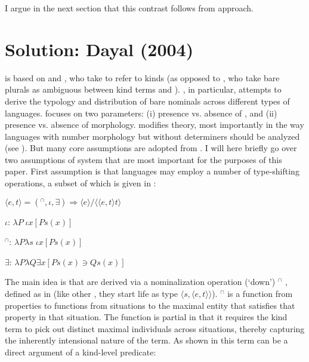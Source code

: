\documentclass[output=paper,
modfonts
]{langscibook}
\begin{document}
	I argue in the next section that this contrast follows from  approach.
	
	\section{Solution: Dayal (2004)} \label{sec:despic:3} 
	
	\citet{Dayal2004} is based on \citet{Chierchia1998} and \citet{Carlson1977}, who take   to refer to kinds (as opposed to \citealt{Wilkinson1991, Diesing1992, KrifkaGerstnerLink1993, Kratzer1995}, who take bare plurals as ambiguous between kind terms and ). \citet{Chierchia1998}, in particular, attempts to derive the typology and distribution of bare nominals across different types of languages. \citet{Chierchia1998} focuses on two parameters: (i) presence vs. absence of , and (ii) presence vs. absence of  morphology. \citet{Dayal2004}
	modifies  theory, most importantly in the way languages with number
	morphology but without determiners should be analyzed (see ). But many core assumptions are adopted from \citet{Chierchia1998}. I will here briefly go over two assumptions of  system that are most important for the purposes of this paper. First assumption is that languages may employ a number of type-shifting operations, a subset of
	which is given in :
	
	\ea \label{ex:despic:23}
	\ea \label{ex:despic:23a}
	$\langle e,t\rangle=(^\cap,\iota,\exists)\Rightarrow\langle e\rangle/\langle\langle e,t\rangle t\rangle$ 
	
	\ex \label{ex:despic:23b}
	$\iota$: \hfill $\lambda P\;\iota x[Ps(x)]$\hspace{75pt}
	
	\ex \label{ex:despic:23c}
	$^\cap$: \hfill $\lambda P\lambda s\;\iota x[Ps(x)]$\hspace{75pt}
	
	\ex \label{ex:despic:23d}
	$\exists$: \hfill $\lambda P\lambda Q\exists x[Ps(x) \ni Qs(x)]$\hspace{75pt}
	
	\z
	\sn \citep[413]{Dayal2004}
	\z 
	
	The main idea is that   are derived via a nominalization operation (`down') $^\cap$ , defined as in  (like other , they start life as type $\langle s, \langle e, t\rangle\rangle$). $^\cap$ is a function from properties to functions from situations to the maximal entity that satisfies that property in
	that situation. The function is partial in that it requires the kind term to pick out distinct maximal individuals across situations, thereby capturing the inherently intensional nature of the term. As shown in  this term can be a direct argument of a kind-level predicate:
	
\end{document}

